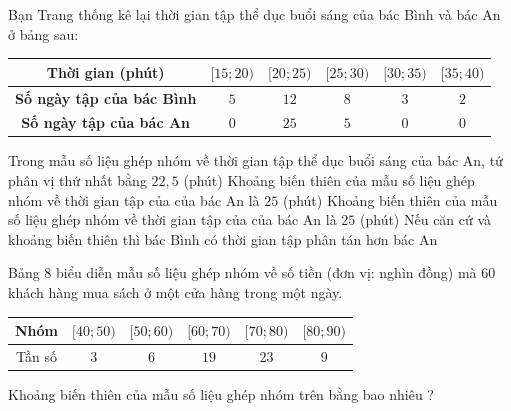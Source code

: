 \begin{ex}%

Bạn Trang thống kê lại thời gian tập thể dục buổi sáng của bác Bình và bác An ở bảng sau:
\begin{center}
\begin{tabular}{|c|c|c|c|c|c|}
\hline
\textbf{Thời gian (phút)} & $[15;20)$ & $[20;25)$ & $[25;30)$ & $[30;35)$ & $[35;40)$\\
\hline
\textbf{Số ngày tập của bác Bình} & $5$ & $12$ & $8$ & $3$ & $2$ \\
\hline
\textbf{Số ngày tập của bác An} & $0$ & $25$ & $5$ & $0$ & $0$\\
\hline
\end{tabular}
\end{center}
\choiceTF
{Trong mẫu số liệu ghép nhóm về thời gian tập thể dục buổi sáng của bác An, tứ phân vị thứ nhất bằng $22{,}5$ (phút)}
{\True Khoảng biến thiên của mẫu số liệu ghép nhóm về thời gian tập của của bác An là $25$ (phút)}
{Khoảng biến thiên của mẫu số liệu ghép nhóm về thời gian tập của của bác An là $25$ (phút)}
{\True Nếu căn cứ và khoảng biến thiên thì bác Bình có thời gian tập phân tán hơn bác An}
\end{ex}

\begin{bt}%

	Bảng $8$ biểu diễn mẫu số liệu ghép nhóm về số tiền (đơn vị: nghìn đồng) mà $60$ khách hàng mua sách ở một cửa hàng trong một ngày.
	\begin{center}
		\begin{tabular}{|c|c|c|c|c|c|}
	\hline Nhóm  &$[40 ; 50)$ & {$[50 ; 60)$} & {$[60 ; 70)$} &	{$[70 ; 80)$} &	{$[80 ; 90)$} \\
	\hline Tần số & $3$ & $6$ & $19$ & $23$ &$9$\\
	\hline
\end{tabular}
	\end{center}
Khoảng biến thiên của mẫu số liệu ghép nhóm trên bằng bao nhiêu ?
\end{bt}

